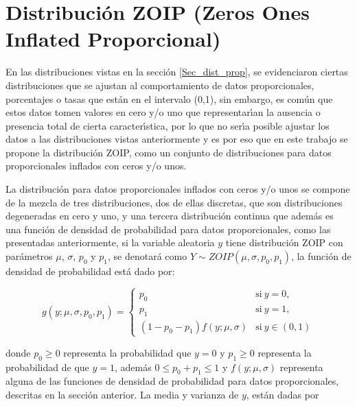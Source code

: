 \section{Distribuci\'{o}n ZOIP (Zeros Ones Inflated Proporcional)}\label{Sec_dist_zoip}

En las distribuciones vistas en la secci\'{o}n \ref{Sec_dist_prop}, se evidenciaron ciertas distribuciones que se ajustan al comportamiento de datos proporcionales, porcentajes o tasas que est\'{a}n en el intervalo (0,1), sin embargo, es com\'{u}n que estos datos tomen valores en cero y/o uno que representar\'{\i}an la ausencia o presencia total de cierta caracter\'{\i}stica, por lo que no ser\'{\i}a posible ajustar los datos a las distribuciones vistas anteriormente y es por eso que en este trabajo se propone la distribuci\'{o}n ZOIP, como un conjunto de distribuciones para datos proporcionales inflados con ceros y/o unos.

La distribuci\'{o}n para datos proporcionales inflados con ceros y/o unos se compone de la mezcla de tres distribuciones, dos de ellas discretas, que son distribuciones degeneradas en cero y uno, y una tercera distribuci\'{o}n continua que adem\'{a}s es una funci\'{o}n de densidad de probabilidad para datos proporcionales, como las presentadas anteriormente, si la variable aleatoria $y$ tiene distribuci\'{o}n ZOIP con par\'{a}metros $\mu$, $\sigma$, $p_0$ y $p_1$, se denotar\'{a} como $Y \sim ZOIP(\mu,\sigma, p_0, p_1)$, la funci\'{o}n de densidad de probabilidad est\'{a} dado por:

\begin{equation}
g(y;\mu,\sigma, p_{0}, p_{1})=
\begin{cases}
p_{0} & \text{si}\ y=0,\\
p_{1} & \text{si}\ y=1,\\
(1-p_{0}-p_{1})f(y;\mu,\sigma) & \text{si}\ y \in (0,1)
\end{cases}
 \label{eq_Dist_ZOIP}
\end{equation}

donde $p_{0} \geq 0$ representa la probabilidad que $y=0$ y $p_{1} \geq 0$ representa la probabilidad de que $y=1$, adem\'{a}s $0\leq p_{0}+p_{1}\leq 1$ y $f(y;\mu,\sigma)$ representa alguna de las funciones de densidad de probabilidad para datos proporcionales, descritas en la secci\'{o}n anterior. La media y varianza de $y$, est\'{a}n dadas por

